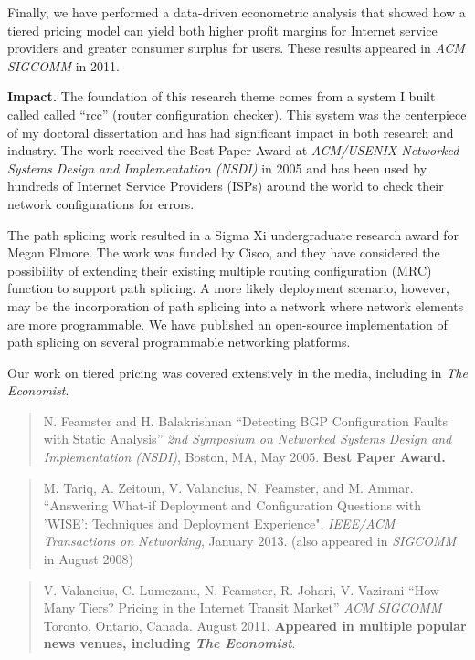 Finally, we have performed a data-driven econometric analysis that
showed how a tiered pricing model can yield both higher profit margins
for Internet service providers and greater consumer surplus for users.
These results appeared in {\em ACM SIGCOMM} in 2011.


{\bf Impact.} The foundation of this research theme comes from a system
I built called called ``rcc'' (router configuration checker).  This
system was the centerpiece of my doctoral dissertation and has had
significant impact in both research and industry.  The work received the
Best Paper Award at {\em ACM/USENIX Networked Systems Design and
Implementation (NSDI)} in 2005 and has been used by hundreds of Internet
Service Providers (ISPs) around the world to check their network
configurations for errors.

The path splicing work resulted in a Sigma Xi undergraduate research
award for Megan Elmore.  The work was funded by Cisco, and they have
considered the possibility of extending their existing multiple routing
configuration (MRC) function to support path splicing.  A more likely
deployment scenario, however, may be the incorporation of path splicing
into a network where network elements are more programmable.  We have
published an open-source implementation of path splicing on several
programmable networking platforms.

Our work on tiered pricing was covered extensively in the media,
including in {\em The Economist}.

\begin{quote}
N. Feamster and H. Balakrishnan ``Detecting BGP Configuration Faults
with Static Analysis'' {\em 2nd Symposium on Networked Systems Design
and Implementation (NSDI)}, Boston, MA, May 2005. {\bf Best Paper Award.}
\end{quote}

\begin{quote}
M. Tariq, A. Zeitoun, V. Valancius, N. Feamster, and
M. Ammar. ``Answering What-if Deployment and Configuration Questions
with 'WISE': Techniques and Deployment Experience". {\em IEEE/ACM
Transactions on Networking}, January 2013. (also appeared in {\em
SIGCOMM} in August 2008)
\end{quote}


\begin{quote}
V. Valancius, C. Lumezanu, N. Feamster, R. Johari, V. Vazirani
``How Many Tiers? Pricing in the Internet Transit Market''
{\em ACM SIGCOMM}
Toronto, Ontario, Canada. August 2011. {\bf Appeared in multiple popular
news venues, including {\it The Economist}}.
\end{quote}



